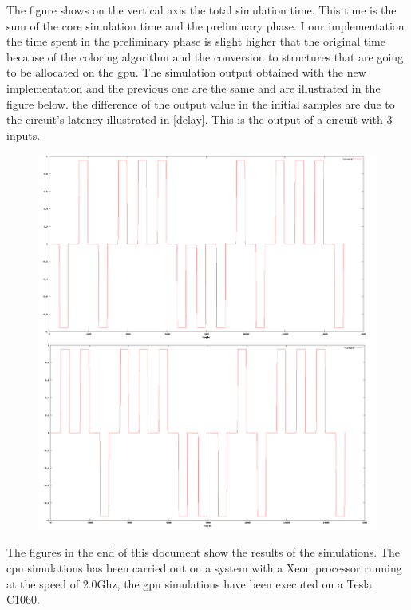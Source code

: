 The figure shows on the vertical axis the total simulation time. This time is the sum of the core simulation time and the preliminary phase. I our implementation the time spent in the preliminary phase is slight higher that the original time because of the coloring algorithm and the conversion to structures that are going to be allocated on the gpu.\newline
The simulation output obtained with the new implementation and the previous one are the same and are illustrated in the figure below. the difference of the output value in the initial samples are due to the circuit's latency illustrated in \ref{delay}. This is the output of a circuit with 3 inputs.
\begin{figure}
\centering
\includegraphics[scale=0.6]{img/result.png}
\label{graph5}
\end{figure}
The figures in the end of this document show the results of the simulations. The cpu simulations has been carried out on a system with a Xeon processor running at the speed of 2.0Ghz, the gpu simulations have been executed on a Tesla C1060. 